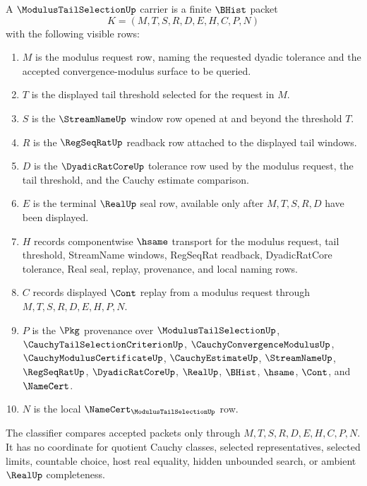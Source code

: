 \begin{definition}
\label{def:modulus-tail-selection-carrier}
A $\ModulusTailSelectionUp$ carrier is a finite $\BHist$ packet
$$
K=(M,T,S,R,D,E,H,C,P,N)
$$
with the following visible rows:
\begin{enumerate}
\item $M$ is the modulus request row, naming the requested dyadic tolerance and the accepted convergence-modulus surface to be queried.
\item $T$ is the displayed tail threshold selected for the request in $M$.
\item $S$ is the $\StreamNameUp$ window row opened at and beyond the threshold $T$.
\item $R$ is the $\RegSeqRatUp$ readback row attached to the displayed tail windows.
\item $D$ is the $\DyadicRatCoreUp$ tolerance row used by the modulus request, the tail threshold, and the Cauchy estimate comparison.
\item $E$ is the terminal $\RealUp$ seal row, available only after $M,T,S,R,D$ have been displayed.
\item $H$ records componentwise $\hsame$ transport for the modulus request, tail threshold, StreamName windows, RegSeqRat readback, DyadicRatCore tolerance, Real seal, replay, provenance, and local naming rows.
\item $C$ records displayed $\Cont$ replay from a modulus request through $M,T,S,R,D,E,H,P,N$.
\item $P$ is the $\Pkg$ provenance over $\ModulusTailSelectionUp$, $\CauchyTailSelectionCriterionUp$, $\CauchyConvergenceModulusUp$, $\CauchyModulusCertificateUp$, $\CauchyEstimateUp$, $\StreamNameUp$, $\RegSeqRatUp$, $\DyadicRatCoreUp$, $\RealUp$, $\BHist$, $\hsame$, $\Cont$, and $\NameCert$.
\item $N$ is the local $\NameCert_{\ModulusTailSelectionUp}$ row.
\end{enumerate}
The classifier compares accepted packets only through $M,T,S,R,D,E,H,C,P,N$. It has no coordinate for quotient Cauchy classes, selected representatives, selected limits, countable choice, host real equality, hidden unbounded search, or ambient $\RealUp$ completeness.
\end{definition}

